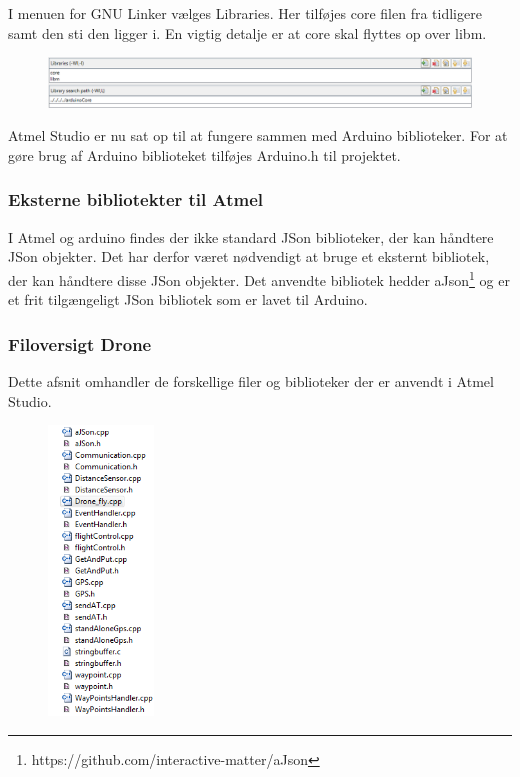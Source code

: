 I menuen for GNU Linker vælges Libraries. Her tilføjes core filen fra tidligere samt den sti den ligger i. En vigtig detalje er at core skal flyttes op over libm.
\begin{figure}[H]
	\centering
	\includegraphics[width=1\textwidth]{Billeder/implementation/Howtoguide/atmel_linker.png}
\end{figure}

Atmel Studio er nu sat op til at fungere sammen med Arduino biblioteker. For at gøre brug af Arduino biblioteket tilføjes Arduino.h til projektet.

\subsubsection*{Eksterne bibliotekter til Atmel}

I Atmel og arduino findes der ikke standard JSon biblioteker, der kan håndtere JSon objekter. Det har derfor været nødvendigt at bruge et eksternt bibliotek, der kan håndtere disse JSon objekter.
Det anvendte bibliotek hedder aJson\footnote{https://github.com/interactive-matter/aJson} og er et frit tilgængeligt JSon bibliotek som er lavet til Arduino.


\subsubsection*{Filoversigt Drone}

Dette afsnit omhandler de forskellige filer og biblioteker der er anvendt i Atmel Studio. 


\begin{figure}[H]
	\centering
	\includegraphics[width=0.25\textwidth]{Billeder/implementation/Howtoguide/atmel_filer.png}
\end{figure}

